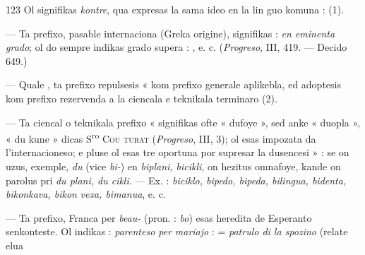 \begin{VUpage}[127]{123}
Ol signifikas \textit{kontre}, qua expresas la sama ideo en la lin\cc
guo komuna :  (1).\parplein

 --- Ta prefixo, pasable internaciona (Greka origine),\nl
signifikas : \textit{en eminenta grado}; ol do sempre indikas grado\nl
supera : , e. c. (\textit{Progreso},\nl
III, 419. --- Decido 649.)

 --- Quale , ta prefixo repulsesis « kom prefixo\nl
generale aplikebla, ed adoptesis kom prefixo rezervenda a\nl
la ciencala e teknikala terminaro (2).

 --- Ta ciencal o teknikala prefixo « signifikas ofte\nl
« dufoye », sed anke « duopla », « du kune » dicas S\textsuperscript{ro} \textsc{Cou}\cc
\textsc{turat} (\textit{Progreso}, III, 3); ol esas impozata da l'internacioneso;\nl
e pluse ol esas tre oportuna por supresar la dusencesi » : se\nl
on uzus, exemple, \textit{du} (vice \textit{bi-}) en \textit{biplani, bicikli}, on hezitus\nl
omnafoye, kande on parolus pri \textit{du plani, du cikli}. --- Ex. :\nl
\textit{biciklo, bipedo, bipeda, bilingua, bidenta, bikonkava, bikon}\cc
\textit{vexa, bimanua}, e. c.

 --- Ta prefixo, Franca per \textit{beau-} (pron. : \textit{bo}) esas\nl
heredita de Esperanto senkonteste. Ol indikas : \textit{parenteso per}\nl
\textit{mariajo} :  = \textit{patrulo di la spozino} (relate elua\parplein
\end{VUpage}

